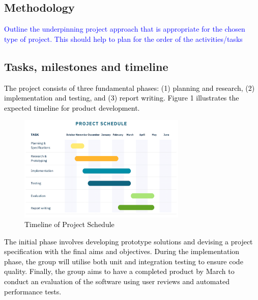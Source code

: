 \documentclass[acmtog, nonacm]{acmart}
\begin{document}
\subsection{Methodology}
\textcolor{blue}{Outline the underpinning project approach that is appropriate for the chosen type of project. This should help to plan for the order of the activities/tasks}


\subsection{Tasks, milestones and timeline}
\textcolor{black}{The project consists of three fundamental phases: (1) planning and research, (2) implementation and testing, and (3) report writing. Figure 1 illustrates the expected timeline for product development. 
\begin{figure}[htp]
    \centering
    \includegraphics[width=8cm]{project-timeline.png}
    \caption{Timeline of Project Schedule}
    \label{fig:schedule}
\end{figure}}

\textcolor{black}{The initial phase involves developing prototype solutions and devising a project specification with the final aims and objectives. During the implementation phase, the group will utilise both unit and integration testing to ensure code quality. Finally, the group aims to have a completed product by March to conduct an evaluation of the software using user reviews and automated performance tests. }
\end{document}
